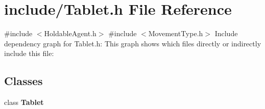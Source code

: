 \section{include/\+Tablet.h File Reference}
\label{_tablet_8h}
{\ttfamily \#include $<$Holdable\+Agent.\+h$>$}\newline
{\ttfamily \#include $<$Movement\+Type.\+h$>$}\newline
Include dependency graph for Tablet.\+h\+:
This graph shows which files directly or indirectly include this file\+:
\subsection*{Classes}
\begin{DoxyCompactItemize}
\item 
class \textbf{ Tablet}
\end{DoxyCompactItemize}
